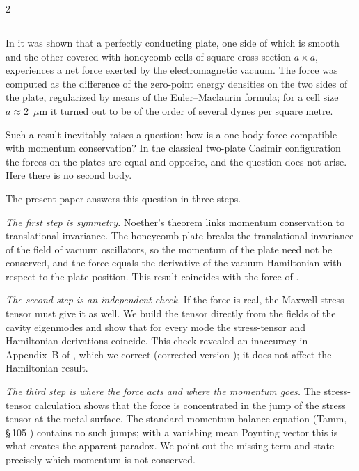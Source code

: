 \documentclass[twoside, 10pt]{article}
\def\myvspacebeforesubsection{-2.0mm}
\def\myvspaceaftersubsection{-2.5mm}
\begin{document}
\begin{multicols}{2}

\vspace{\myvspacebeforesubsection}
\subsection*{}
\vspace{\myvspaceaftersubsection}


In \cite{Drozdov2024} it was shown that a perfectly conducting plate, one side of which is smooth
and the other covered with honeycomb cells of square cross-section \(a\times a\), experiences a net
force exerted by the electromagnetic vacuum. The force was computed as the difference of the
zero-point energy densities on the two sides of the plate, regularized by means of the
Euler--Maclaurin formula; for a cell size \(a\approx2\)~\(\mu\)m it turned out to be of the order of
several dynes per square metre.

Such a result inevitably raises a question: how is a one-body force compatible with momentum
conservation? In the classical two-plate Casimir configuration the forces on the plates are equal
and opposite, and the question does not arise. Here there is no second body.

The present paper answers this question in three steps.

\textit{The first step is symmetry.} Noether's theorem \cite{Noether1918} links momentum
conservation to translational invariance. The honeycomb plate breaks the translational invariance of the field of vacuum oscillators, so the momentum of the plate need not be conserved, and the force equals the derivative of the vacuum Hamiltonian with
respect to the plate position. This result coincides with the force of \cite{Drozdov2024}.

\textit{The second step is an independent check.} If the force is real, the Maxwell stress tensor
must give it as well. We build the tensor directly from the fields of the cavity eigenmodes and show
that for every mode the stress-tensor and Hamiltonian derivations coincide. This check revealed an inaccuracy in Appendix~B of \cite{Drozdov2024}, which we correct (corrected version \cite{Drozdov2024fix}); it does not affect the Hamiltonian
result.

\textit{The third step is where the force acts and where the momentum goes.} The stress-tensor
calculation shows that the force is concentrated in the jump of the stress tensor at the metal
surface. The standard momentum balance equation (Tamm, \S\,105 \cite{Tamm1957}) contains no such
jumps; with a vanishing mean Poynting vector this is what creates the apparent paradox. We point out
the missing term and state precisely which momentum is not conserved.


\end{multicols}
\end{document}

